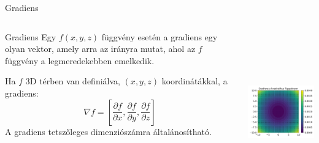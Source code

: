 \documentclass[english, aspectratio=169]{beamer}
\begin{document}
\begin{frame}{Gradiens}
\begin{columns}
\begin{column}{.5\textwidth}
\begin{block}{Gradiens}
Egy $f\left( x,y,z \right)$ függvény esetén a gradiens egy olyan vektor, amely arra az irányra mutat, ahol az $f$ függvény a legmeredekebben emelkedik.\par\smallskip
Ha $f$ 3D térben van definiálva, $\left( x,y,z \right)$ koordinátákkal, a gradiens: 
\[
\nabla f = \left[ \frac{\partial f}{\partial x}, \frac{\partial f}{\partial y}, \frac{\partial f}{\partial z} \right]
\]
A gradiens tetszőleges dimenziószámra általánosítható. 
\end{block}
\end{column}
\begin{column}{.5\textwidth}
\begin{center}
\includegraphics[width=7cm, height=7cm, keepaspectratio]{images/regresszio_17.png}
\end{center}
\end{column}
\end{columns}
\end{frame}
\end{document}
